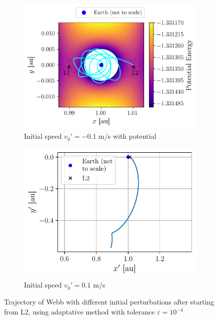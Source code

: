 \begin{figure}[h]
    \centering
    \begin{subfigure}{0.53\linewidth}
        \centering
        \includegraphics[width=\linewidth]{figures/potential_L1_L2_zoom_trajectory.png}
        \caption{Initial speed \(v_y' = -0.1\) m/s with potential}
        \label{fig:lagrange_trajectory_potential}
    \end{subfigure}
    \begin{subfigure}{0.45\linewidth}
        \centering
        \includegraphics[width=\linewidth]{figures/lagrange_v0_up.pdf}
        \caption{Initial speed \(v_y' = 0.1\) m/s}
        \label{fig:lagrange_v0_up}
    \end{subfigure}
    \caption{Trajectory of Webb with different initial perturbations after starting from L2, using adaptative method with tolerance \(\varepsilon = 10^{-4}\)}
\end{figure}

